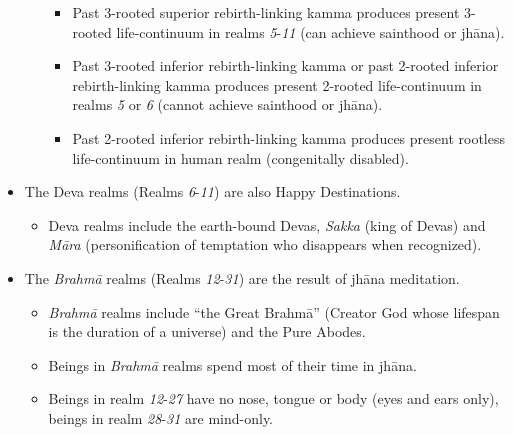 \begin{itemize}
\begin{itemize}
\begin{itemize}
\item Past 3-rooted superior rebirth-linking kamma produces present 3-rooted life-continuum in realms \textit{5}-\textit{11} (can achieve sainthood or jhāna).

\item Past 3-rooted inferior rebirth-linking kamma or past 2-rooted inferior rebirth-linking kamma produces present 2-rooted life-continuum in realms \textit{5} or \textit{6} (cannot achieve sainthood or jhāna).

\item Past 2-rooted inferior rebirth-linking kamma produces present rootless life-continuum in human realm (congenitally disabled).

\end{itemize}

\end{itemize}

\item The Deva realms (Realms \textit{6}-\textit{11}) are also Happy Destinations.

\begin{itemize}

\item Deva realms include the earth-bound Devas, \textit{Sakka} (king of Devas) and \textit{Māra} (personification of temptation who disappears when recognized).

\end{itemize}

\item The \textit{Brahmā} realms (Realms \textit{12}-\textit{31}) are the result of jhāna meditation.

\begin{itemize}

\item \textit{Brahmā} realms include “the Great Brahmā” (Creator God whose lifespan is the duration of a universe) and the Pure Abodes.

\item Beings in \textit{Brahmā} realms spend most of their time in jhāna.

\item Beings in realm \textit{12}-\textit{27} have no nose, tongue or body (eyes and ears only), beings in realm \textit{28}-\textit{31} are mind-only.

\end{itemize}

\end{itemize}

